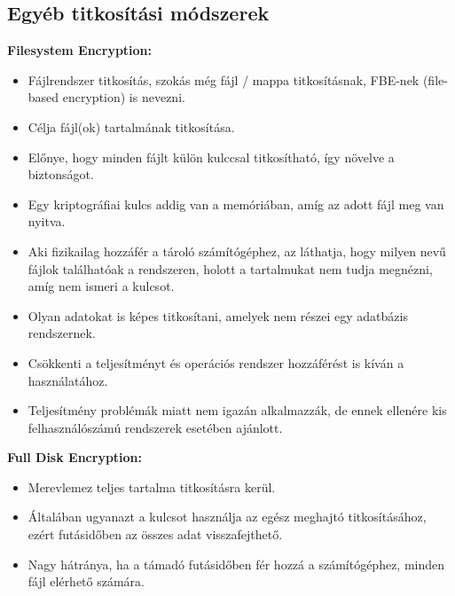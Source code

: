 \subsection{Egyéb titkosítási módszerek}

\vspace{15pt}
\noindent\textbf{Filesystem Encryption:} \cite{enwiki:1020951139} \newline
\begin{itemize}
	\item Fájlrendszer titkosítás, szokás még fájl / mappa titkosításnak, FBE-nek (file-based encryption) is nevezni.
	\item Célja fájl(ok) tartalmának titkosítása.
	\item Előnye, hogy minden fájlt külön kulccsal titkosítható, így növelve a biztonságot.
	\item Egy kriptográfiai kulcs addig van a memóriában, amíg az adott fájl meg van nyitva.
	\item Aki fizikailag hozzáfér a tároló számítógéphez, az láthatja, hogy milyen nevű fájlok találhatóak a rendszeren, holott a tartalmukat nem tudja megnézni, amíg nem ismeri a kulcsot.
	\item Olyan adatokat is képes titkosítani, amelyek nem részei egy adatbázis rendszernek.
	\item Csökkenti a teljesítményt és operációs rendszer hozzáférést is kíván a használatához.
	\item Teljesítmény problémák miatt nem igazán alkalmazzák, de ennek ellenére kis felhasználószámú rendszerek esetében ajánlott.
\end{itemize}


\vspace{25pt}
\noindent\textbf{Full Disk Encryption:} \cite{enwiki:1084723482} \newline
\begin{itemize}
	\item Merevlemez teljes tartalma titkosításra kerül. 
	\item Általában ugyanazt a kulcsot használja az egész meghajtó titkosításához, ezért futásidőben az összes adat visszafejthető.
	\item Nagy hátránya, ha a támadó futásidőben fér hozzá a számítógéphez, minden fájl elérhető számára. 
\end{itemize}

